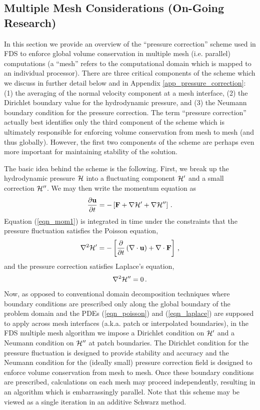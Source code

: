 \documentclass[11pt]{book}
\begin{document}
\subsection{Multiple Mesh Considerations (On-Going Research)}

In this section we provide an overview of the ``pressure correction'' scheme used in FDS to enforce global volume conservation in multiple mesh (i.e. parallel) computations (a ``mesh'' refers to the computational domain which is mapped to an individual processor).  There are three critical components of the scheme which we discuss in further detail below and in Appendix \ref{app_pressure_correction}: (1) the averaging of the normal velocity component at a mesh interface, (2) the Dirichlet boundary value for the hydrodynamic pressure, and (3) the Neumann boundary condition for the pressure correction.  The term ``pressure correction'' actually best identifies only the third component of the scheme which is ultimately responsible for enforcing volume conservation from mesh to mesh (and thus globally).  However, the first two components of the scheme are perhaps even more important for maintaining stability of the solution.

The basic idea behind the scheme is the following.  First, we break up the hydrodynamic pressure ${\cal H}$ into a fluctuating component ${\cal H}'$ and a small correction $\cal H''$.  We may then write the momentum equation as
\begin{equation}
\label{eqn_mom1}
\frac{\partial \mathbf{u}}{\partial t} = - \left[ \mathbf{F} + \nabla {\cal H}' + \nabla {\cal H}'' \right] \,\mbox{.}
\end{equation}
Equation (\ref{eqn_mom1}) is integrated in time under the constraints that the pressure fluctuation satisfies the Poisson equation,
\begin{equation}
\label{eqn_poisson}
\nabla^2 {\cal H}' = - \left[ \frac{\partial}{\partial t} \left(\nabla\cdot \mathbf{u}\right) + \nabla\cdot \mathbf{F} \right] \,\mbox{,}
\end{equation}
and the pressure correction satisfies Laplace's equation,
\begin{equation}
\label{eqn_laplace}
\nabla^2 {\cal H}'' = 0 \,\mbox{.}
\end{equation}
Now, as opposed to conventional domain decomposition techniques where boundary conditions are prescribed only along the global boundary of the problem domain and the PDEs (\ref{eqn_poisson}) and (\ref{eqn_laplace}) are supposed to apply across mesh interfaces (a.k.a. patch or interpolated boundaries), in the FDS multiple mesh algorithm we impose a Dirichlet condition on ${\cal H}^\prime$ and a Neumann condition on ${\cal H}^{\prime\prime}$ at patch boundaries.  The Dirichlet condition for the pressure fluctuation is designed to provide stability and accuracy and the Neumann condition for the (ideally small) pressure correction field is designed to enforce volume conservation from mesh to mesh.  Once these boundary conditions are prescribed, calculations on each mesh may proceed independently, resulting in an algorithm which is embarrassingly parallel.  Note that this scheme may be viewed as a single iteration in an additive Schwarz method.
\end{document}
